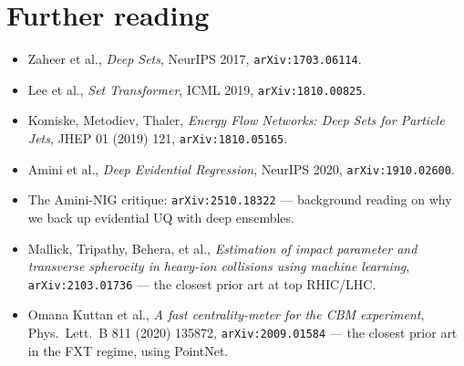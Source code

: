 \documentclass[11pt]{article}
\begin{document}
\section*{Further reading}

\begin{itemize}[leftmargin=*, itemsep=2pt]
\item Zaheer et al., \emph{Deep Sets}, NeurIPS 2017,
      \texttt{arXiv:1703.06114}.
\item Lee et al., \emph{Set Transformer}, ICML 2019,
      \texttt{arXiv:1810.00825}.
\item Komiske, Metodiev, Thaler, \emph{Energy Flow Networks: Deep
      Sets for Particle Jets}, JHEP 01 (2019) 121,
      \texttt{arXiv:1810.05165}.
\item Amini et al., \emph{Deep Evidential Regression}, NeurIPS 2020,
      \texttt{arXiv:1910.02600}.
\item The Amini-NIG critique: \texttt{arXiv:2510.18322} ---
      background reading on why we back up evidential UQ with deep
      ensembles.
\item Mallick, Tripathy, Behera, et al., \emph{Estimation of impact
      parameter and transverse spherocity in heavy-ion collisions
      using machine learning}, \texttt{arXiv:2103.01736} --- the
      closest prior art at top RHIC/LHC.
\item Omana Kuttan et al., \emph{A fast centrality-meter for the CBM
      experiment}, Phys.\ Lett.\ B 811 (2020) 135872,
      \texttt{arXiv:2009.01584} --- the closest prior art in the FXT
      regime, using PointNet.
\end{itemize}
\end{document}
